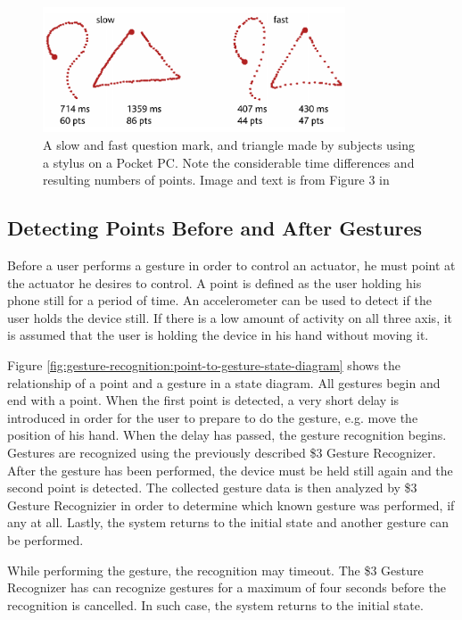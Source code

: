 \begin{figure}[!htb]
  \centering
  \includegraphics[width=0.8\textwidth]{images/1-dollar-gesturetrace.png}
  \caption{A slow and fast question mark, and triangle made by subjects using a stylus on a Pocket PC. Note the considerable time differences and resulting numbers of points. Image and text is from Figure 3 in \cite{wobbrock2007gestures}}
  \label{fig:onedollar-gesturetrace}
\end{figure}

\subsection{Detecting Points Before and After Gestures}

Before a user performs a gesture in order to control an actuator, he must point at the actuator he desires to control. A point is defined as the user holding his phone still for a period of time. An accelerometer can be used to detect if the user holds the device still. If there is a low amount of activity on all three axis, it is assumed that the user is holding the device in his hand without moving it.

Figure \ref{fig:gesture-recognition:point-to-gesture-state-diagram} shows the relationship of a point and a gesture in a state diagram. All gestures begin and end with a point. When the first point is detected, a very short delay is introduced in order for the user to prepare to do the gesture, e.g. move the position of his hand. When the delay has passed, the gesture recognition begins. Gestures are recognized using the previously described \$3 Gesture Recognizer. After the gesture has been performed, the device must be held still again and the second point is detected. The collected gesture data is then analyzed by \$3 Gesture Recognizier in order to determine which known gesture was performed, if any at all. Lastly, the system returns to the initial state and another gesture can be performed.

While performing the gesture, the recognition may timeout. The \$3 Gesture Recognizer has can recognize gestures for a maximum of four seconds before the recognition is cancelled. In such case, the system returns to the initial state.

